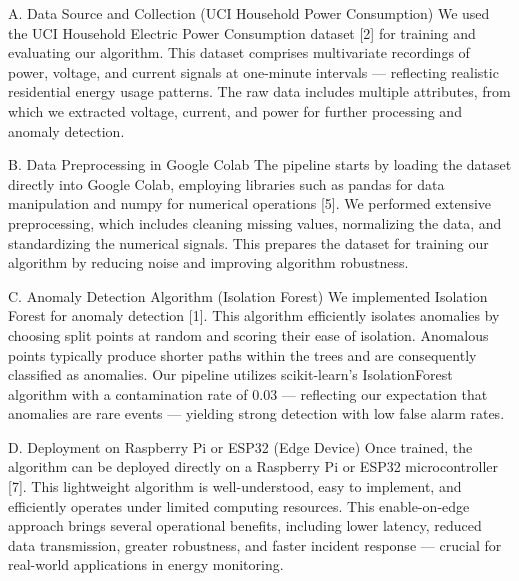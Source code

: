 \documentclass[12pt, draftclsnofoot, onecolumn]{IEEEtran}
\begin{document}
A. Data Source and Collection (UCI Household Power Consumption)
We used the UCI Household Electric Power Consumption dataset [2] for training and evaluating our algorithm. This dataset comprises multivariate recordings of power, voltage, and current signals at one-minute intervals — reflecting realistic residential energy usage patterns. The raw data includes multiple attributes, from which we extracted voltage, current, and power for further processing and anomaly detection.

B. Data Preprocessing in Google Colab
The pipeline starts by loading the dataset directly into Google Colab, employing libraries such as pandas for data manipulation and numpy for numerical operations [5]. We performed extensive preprocessing, which includes cleaning missing values, normalizing the data, and standardizing the numerical signals. This prepares the dataset for training our algorithm by reducing noise and improving algorithm robustness.

C. Anomaly Detection Algorithm (Isolation Forest)
We implemented Isolation Forest for anomaly detection [1]. This algorithm efficiently isolates anomalies by choosing split points at random and scoring their ease of isolation. Anomalous points typically produce shorter paths within the trees and are consequently classified as anomalies. Our pipeline utilizes scikit-learn’s IsolationForest algorithm with a contamination rate of 0.03 — reflecting our expectation that anomalies are rare events — yielding strong detection with low false alarm rates.

D. Deployment on Raspberry Pi or ESP32 (Edge Device)
Once trained, the algorithm can be deployed directly on a Raspberry Pi or ESP32 microcontroller [7]. This lightweight algorithm is well-understood, easy to implement, and efficiently operates under limited computing resources. This enable-on-edge approach brings several operational benefits, including lower latency, reduced data transmission, greater robustness, and faster incident response — crucial for real-world applications in energy monitoring.
\end{document}

